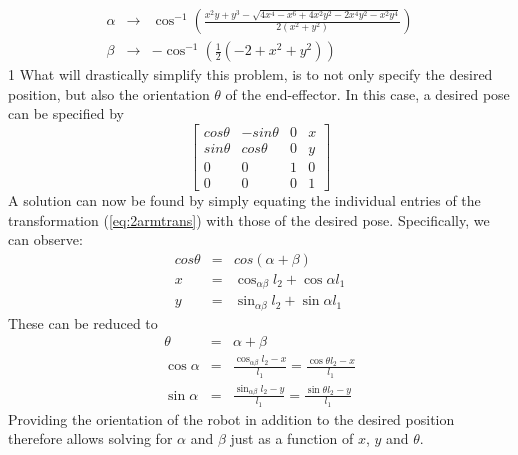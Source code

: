\begin{eqnarray}
\alpha &\rightarrow& \cos^{-1}\left(\frac{x^2 y + y^3 - \sqrt{4 x^4 - x^6 + 4 x^2 y^2 - 2 x^4 y^2 - x^2 y^4}}{2 (x^2 + y^2)}\right) \nonumber \\
\beta &\rightarrow& -\cos^{-1}\left( \frac{1}{2}(-2+x^2+y^2) \right)
\end{eqnarray}
1
What will drastically simplify this problem, is to not only specify the desired position, but also the orientation $\theta$ of the end-effector. In this case, a desired pose can be specified by
\begin{equation}
\left[
\begin{array}{cccc}
cos\theta & -sin\theta & 0 & x\\
sin\theta & cos\theta & 0 & y\\
0 & 0 & 1 & 0\\
0 & 0 & 0 & 1
\end{array}
\right]
\end{equation}
A solution can now be found by simply equating the individual entries of the transformation (\ref{eq:2armtrans}) with those of the desired pose. Specifically, we can observe:
\begin{eqnarray}
cos\theta &=& cos(\alpha+\beta)\\
\nonumber
x &=& \cos_{\alpha\beta}l_2+\cos\alpha l_1\\
\nonumber
y &=& \sin_{\alpha\beta}l_2+\sin\alpha l_1
\end{eqnarray}
These can be reduced to
\begin{eqnarray}
\theta &=& \alpha + \beta \nonumber \\
\cos\alpha &=& \frac{\cos_{\alpha\beta}l_2-x}{l_1}=\frac{\cos\theta l_2-x}{l_1} \\
\sin\alpha &=& \frac{\sin_{\alpha\beta}l_2-y}{l_1}=\frac{\sin\theta l_2-y}{l_1} \nonumber
\end{eqnarray}
Providing the orientation of the robot in addition to the desired position therefore allows solving for $\alpha$ and $\beta$ just as a function of $x$, $y$ and $\theta$.

